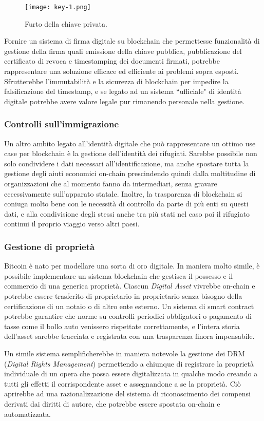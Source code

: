         	\begin{figure}[ht]
        		\centering
        		\texttt{[image: key-1.png]}
        		\caption[Furto della chiave privata]{Furto della chiave privata. \cite{ametrano_signature}}
        		\label{fig:key-1}
        	\end{figure}
        	
   			Fornire un sistema di firma digitale su blockchain che permettesse funzionalità di gestione della firma quali emissione della chiave pubblica, pubblicazione del certificato di revoca e timestamping dei documenti firmati, potrebbe rappresentare una soluzione efficace ed efficiente ai problemi sopra esposti. Sfrutterebbe l'immutabilità e la sicurezza di blockchain per impedire la falsificazione del timestamp, e se legato ad un sistema ``ufficiale" di identità digitale potrebbe avere valore legale pur rimanendo personale nella gestione.
   			
   		\subsubsection{Controlli sull'immigrazione}
   			Un altro ambito legato all'identità digitale che può rappresentare un ottimo use case per blockchain è la gestione dell'identità dei rifugiati. Sarebbe possibile non solo condividere i dati necessari all'identificazione, ma anche spostare tutta la gestione degli aiuti economici on-chain prescindendo quindi dalla moltitudine di organizzazioni che al momento fanno da intermediari, senza gravare eccessivamente sull'apparato statale. Inoltre, la trasparenza di blockchain si coniuga molto bene con le necessità di controllo da parte di più enti su questi dati, e alla condivisione degli stessi anche tra più stati nel caso poi il rifugiato continui il proprio viaggio verso altri paesi.
   			
   		\subsubsection{Gestione di proprietà}
   			Bitcoin è nato per modellare una sorta di oro digitale. In maniera molto simile, è possibile implementare un sistema blockchain che gestisca il possesso e il commercio di una generica proprietà. Ciascun \emph{Digital Asset} vivrebbe on-chain e potrebbe essere trasferito di proprietario in proprietario senza bisogno della certificazione di un notaio o di altro ente esterno. Un sistema di smart contract potrebbe garantire che norme su controlli periodici obbligatori o pagamento di tasse come il bollo auto venissero rispettate correttamente, e l'intera storia dell'asset sarebbe tracciata e registrata con una trasparenza finora impensabile.
   			
   			Un simile sistema semplificherebbe in maniera notevole la gestione dei DRM (\emph{Digital Rights Management}) permettendo a chiunque di registrare la proprietà individuale di un opera che possa essere digitalizzata in qualche modo creando a tutti gli effetti il corrispondente asset e assegnandone a se la proprietà. Ciò aprirebbe ad una razionalizzazione del sistema di riconoscimento dei compensi derivati dai diritti di autore, che potrebbe essere spostata on-chain e automatizzata.
